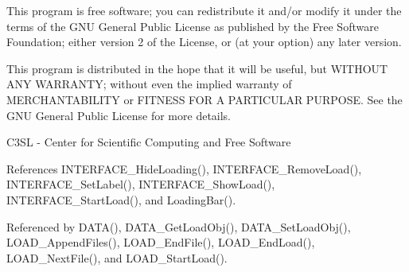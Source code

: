 This program is free software; you can redistribute it and/or modify it under the terms of the GNU General Public License as published by the Free Software Foundation; either version 2 of the License, or (at your option) any later version.

This program is distributed in the hope that it will be useful, but WITHOUT ANY WARRANTY; without even the implied warranty of MERCHANTABILITY or FITNESS FOR A PARTICULAR PURPOSE. See the GNU General Public License for more details.

C3SL - Center for Scientific Computing and Free Software 

References INTERFACE\_\-HideLoading(), INTERFACE\_\-RemoveLoad(), INTERFACE\_\-SetLabel(), INTERFACE\_\-ShowLoad(), INTERFACE\_\-StartLoad(), and LoadingBar().

Referenced by DATA(), DATA\_\-GetLoadObj(), DATA\_\-SetLoadObj(), LOAD\_\-AppendFiles(), LOAD\_\-EndFile(), LOAD\_\-EndLoad(), LOAD\_\-NextFile(), and LOAD\_\-StartLoad().